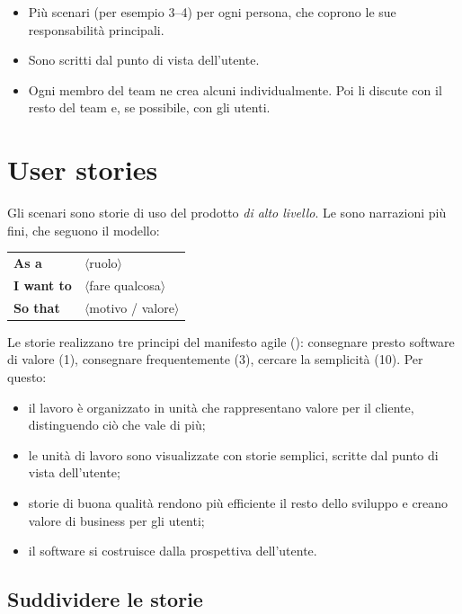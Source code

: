 \begin{itemize}
  \item Più scenari (per esempio 3--4) per ogni persona, che coprono le sue responsabilità principali.
  \item Sono scritti dal punto di vista dell'utente.
  \item Ogni membro del team ne crea alcuni individualmente. Poi li discute con il resto del team e, se possibile, con
    gli utenti.
\end{itemize}

\section{User stories}
\label{sec:feature-storie}

\begin{definizione}
Gli scenari sono storie di uso del prodotto \emph{di alto livello}. Le  sono narrazioni più
fini, che seguono il modello:

\smallskip
\begin{tabular}{@{}ll@{}}
\textbf{As a} & $\langle$ruolo$\rangle$ \\
\textbf{I want to} & $\langle$fare qualcosa$\rangle$ \\
\textbf{So that} & $\langle$motivo / valore$\rangle$ \\
\end{tabular}
\end{definizione}

Le storie realizzano tre principi del manifesto agile (): consegnare presto software di
valore (1), consegnare frequentemente (3), cercare la semplicità (10). Per questo:
\begin{itemize}
  \item il lavoro è organizzato in unità che rappresentano valore per il cliente, distinguendo ciò che vale di più;
  \item le unità di lavoro sono visualizzate con storie semplici, scritte dal punto di vista dell'utente;
  \item storie di buona qualità rendono più efficiente il resto dello sviluppo e creano valore di business per gli utenti;
  \item il software si costruisce dalla prospettiva dell'utente.
\end{itemize}

\subsection*{Suddividere le storie}

